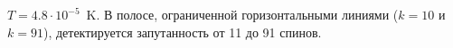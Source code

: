 $T=4.8\cdot10^{-5}$~K.
В полосе, ограниченной горизонтальными линиями ($k=10$ и $k=91$),
детектируется запутанность от 11 до 91 спинов.

